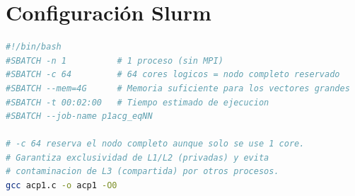 \documentclass[12pt,a4paper]{article}
\begin{document}
\appendix
\section{Configuración Slurm}

\begin{lstlisting}[language=bash, caption={Cabecera de los scripts Slurm (idéntica en las tres variantes)}, label=lst:slurm]
#!/bin/bash
#SBATCH -n 1          # 1 proceso (sin MPI)
#SBATCH -c 64         # 64 cores logicos = nodo completo reservado
#SBATCH --mem=4G      # Memoria suficiente para los vectores grandes
#SBATCH -t 00:02:00   # Tiempo estimado de ejecucion
#SBATCH --job-name p1acg_eqNN

# -c 64 reserva el nodo completo aunque solo se use 1 core.
# Garantiza exclusividad de L1/L2 (privadas) y evita
# contaminacion de L3 (compartida) por otros procesos.
gcc acp1.c -o acp1 -O0
\end{lstlisting}
\end{document}
